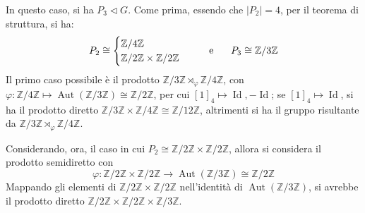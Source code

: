 \documentclass[11pt]{article}
\theoremstyle{style}
\numberwithin{equation}{subsection}
\begin{document}
\begin{itemize}
		In questo caso, si ha $P_3 \lhd G$.
		Come prima, essendo che $|P_2| = 4$, per il teorema di struttura, si ha:
		\[
		P_2\cong \begin{cases}
			\mathbb{Z} / 4 \mathbb{Z}\\
			\mathbb{Z} / 2\mathbb{Z} \times  \mathbb{Z} / 2\mathbb{Z}
		\end{cases}
		\hspace{.5cm} \text{ e } \hspace{.5cm} P_3\cong \mathbb{Z}/3\mathbb{Z}
		\] 
		Il primo caso possibile \`e il prodotto $\mathbb{Z} / 3\mathbb{Z} \rtimes _\varphi \mathbb{Z}/ 4 \mathbb{Z}$, con $\varphi : \mathbb{Z}/ 4\mathbb{Z} \longmapsto \operatorname{Aut} (\mathbb{Z}/3\mathbb{Z})\cong \mathbb{Z} / 2\mathbb{Z}$, per cui $[1]_4 \longmapsto \operatorname{Id} , -\operatorname{Id}$; se $[1]_4 \mapsto \operatorname{Id} $, si ha il prodotto diretto $\mathbb{Z} / 3\mathbb{Z} \times \mathbb{Z} / 4\mathbb{Z} \cong \mathbb{Z}/12\mathbb{Z}$, altrimenti si ha il gruppo risultante da $\mathbb{Z}/ 3\mathbb{Z}\rtimes _\varphi \mathbb{Z}/4\mathbb{Z}$.

		Considerando, ora, il caso in cui $P_2 \cong \mathbb{Z} /2 \mathbb{Z} \times  \mathbb{Z}/2\mathbb{Z}$, allora si considera il prodotto semidiretto con 
		\[
		\varphi : \mathbb{Z} / 2\mathbb{Z} \times \mathbb{Z}/2\mathbb{Z} \longrightarrow \operatorname{Aut} (\mathbb{Z}/3\mathbb{Z}) \cong \mathbb{Z}/2\mathbb{Z}
		\] 
		Mappando gli elementi di $\mathbb{Z}/2\mathbb{Z}\times \mathbb{Z}/2\mathbb{Z}$ nell'identit\`a di $\operatorname{Aut} (\mathbb{Z}/3\mathbb{Z})$, si avrebbe il prodotto diretto $\mathbb{Z}/2\mathbb{Z} \times \mathbb{Z}/2\mathbb{Z} \times \mathbb{Z}/3\mathbb{Z}$.


\end{itemize}
\end{document}
